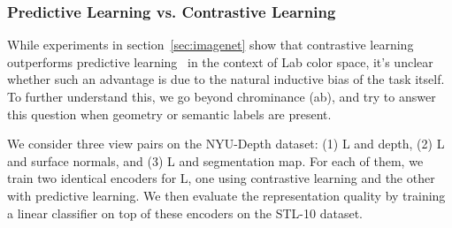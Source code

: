 \documentclass[10pt,twocolumn,letterpaper]{article}
\newcommand{\citep}[1]{\cite{#1}}
\begin{document}
\subsubsection{Predictive Learning vs. Contrastive Learning}
While experiments in section~\ref{sec:imagenet} show that contrastive learning outperforms predictive learning~\citep{zhang2017split} in the context of Lab color space, it's unclear whether such an advantage is due to the natural inductive bias of the task itself. To further understand this, we go beyond chrominance (ab), and try to answer this question when geometry or semantic labels are present.

We consider three view pairs on the NYU-Depth dataset: (1) L and depth, (2) L and surface normals, and (3) L and segmentation map. For each of them, we train two identical encoders for L, one using contrastive learning and the other with predictive learning. We then evaluate the representation quality by training a linear classifier on top of these encoders on the STL-10 dataset. 
\end{document}
